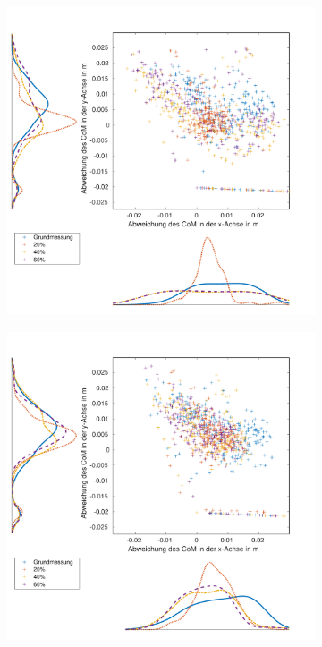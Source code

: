 \begin{figure}[tb]
	\centering
	\begin{adjustwidth}{-0.2\linewidth}{-0.2\linewidth}
		\hspace{5pt}
		\begin{subfigure}[c]{.45\linewidth}
			\centering
			\includegraphics[width=\linewidth]{Bilder/links_CoM_ohneM.pdf}
			\vspace{5pt}
		\end{subfigure}
		\hspace{20pt}
		\begin{subfigure}[c]{.45\linewidth}
			\centering
			\includegraphics[width=\linewidth]{Bilder/links_CoM_mitM.pdf}

\end{subfigure}
\end{adjustwidth}
\end{figure}
